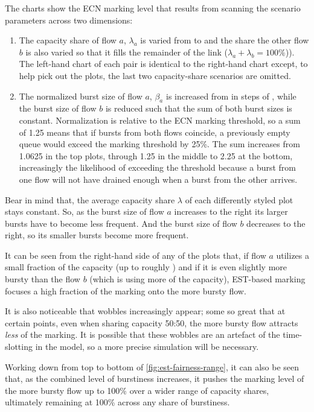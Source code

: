 The charts show the ECN marking level that results from scanning the scenario parameters across two dimensions:
\begin{enumerate}
	\item The capacity share of flow \(a\), \(\lambda_a\) is varied from  to  and the share the other flow \(b\) is also varied so that it fills the remainder of the link (\(\lambda_a+\lambda_b=100\%\))). The left-hand chart of each pair is identical to the right-hand chart except, to help pick out the plots, the last two capacity-share scenarios are omitted.
	\item The normalized burst size of flow \(a\), \(\beta_a\) is increased from  in steps of , while the burst size of flow \(b\) is reduced such that the sum of both burst sizes is constant. Normalization is relative to the ECN marking threshold, so a sum of 1.25 means that if bursts from both flows coincide, a previously empty queue would exceed the marking threshold by 25\%. The sum increases from 1.0625 in the top plots, through 1.25 in the middle to 2.25 at the bottom, increasingly the likelihood of exceeding the threshold because a burst from one flow will not have drained enough when a burst from the other arrives.
\end{enumerate}

Bear in mind that, the average capacity share \(\lambda\) of each differently styled plot stays constant. So, as the burst size of flow \(a\) increases to the right its larger bursts have to become less frequent. And the burst size of flow \(b\) decreases to the right, so its smaller bursts become more frequent.

It can be seen from the right-hand side of any of the plots that, if flow \(a\) utilizes a small fraction of the capacity (up to roughly ) and if it is even slightly more bursty than the flow \(b\) (which is using more of the capacity), EST-based marking focuses a high fraction of the marking onto the more bursty flow. 

It is also noticeable that wobbles increasingly appear; some so great that at certain points, even when sharing capacity 50:50, the more bursty flow attracts \emph{less} of the marking. It is possible that these wobbles are an artefact of the time-slotting in the model, so a more precise simulation will be necessary.

Working down from top to bottom of \autoref{fig:est-fairness-range}, it can also be seen that, as the combined level of burstiness increases, it pushes the marking level of the more bursty flow up to 100\% over a wider range of capacity shares, ultimately remaining at 100\% across any share of burstiness.

